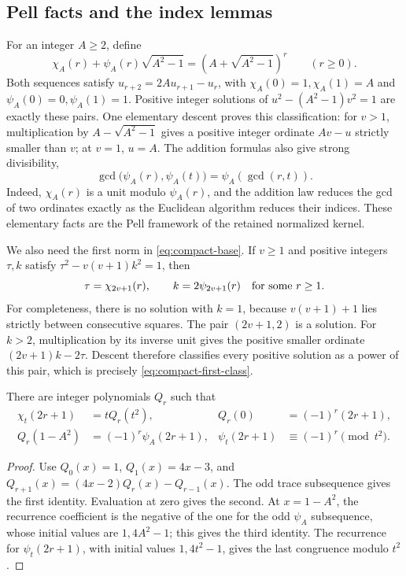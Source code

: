 \subsection{Pell facts and the index lemmas}
\label{subsec:compact-pell}

For an integer \(A\ge2\), define
\[
 \chi_A(r)+\psi_A(r)\sqrt{A^2-1}
       =(A+\sqrt{A^2-1})^r\qquad(r\ge0).
\]
Both sequences satisfy \(u_{r+2}=2Au_{r+1}-u_r\), with
\(\chi_A(0)=1,\chi_A(1)=A\) and
\(\psi_A(0)=0,\psi_A(1)=1\).
Positive integer solutions of \(u^2-(A^2-1)v^2=1\) are exactly these
pairs.  One elementary descent proves this classification: for \(v>1\),
multiplication by \(A-\sqrt{A^2-1}\) gives a positive integer ordinate
\(Av-u\) strictly smaller than \(v\); at \(v=1\), \(u=A\).
The addition formulas also give strong divisibility,
\begin{equation}
 \gcd\bigl(\psi_A(r),\psi_A(t)\bigr)
       =\psi_A(\gcd(r,t)).                         \label{eq:compact-gcd}
\end{equation}
Indeed, \(\chi_A(r)\) is a unit modulo \(\psi_A(r)\), and the addition
law reduces the gcd of two ordinates exactly as the Euclidean algorithm
reduces their indices.  These elementary facts are the Pell framework
of the retained normalized kernel.\cite{native61}

We also need the first norm in \eqref{eq:compact-base}.  If \(v\ge1\)
and positive integers \(\tau,k\) satisfy
\(\tau^2-v(v+1)k^2=1\), then
\begin{equation}
 \tau=\chi_{2v+1}(r),\qquad k=2\psi_{2v+1}(r)
 \quad\hbox{for some }r\ge1.                       \label{eq:compact-first-class}
\end{equation}
For completeness, there is no solution with \(k=1\), because
\(v(v+1)+1\) lies strictly between consecutive squares.  The pair
\((2v+1,2)\) is a solution.  For \(k>2\), multiplication by its inverse
unit gives the positive smaller ordinate \((2v+1)k-2\tau\).  Descent
therefore classifies every positive solution as a power of this pair,
which is precisely \eqref{eq:compact-first-class}.

\begin{lemma}
\label{lem:compact-odd}
There are integer polynomials \(Q_r\) such that
\begin{align*}
 \chi_t(2r+1)&=tQ_r(t^2),&
 Q_r(0)&=(-1)^r(2r+1),\\
 Q_r(1-A^2)&=(-1)^r\psi_A(2r+1),&
 \psi_t(2r+1)&\equiv(-1)^r\pmod{t^2}.
\end{align*}
\end{lemma}
\begin{proof}
Use \(Q_0(x)=1\), \(Q_1(x)=4x-3\), and
\(Q_{r+1}(x)=(4x-2)Q_r(x)-Q_{r-1}(x)\).
The odd trace subsequence gives the first identity.  Evaluation at zero
gives the second.  At \(x=1-A^2\), the recurrence coefficient is the
negative of the one for the odd \(\psi_A\) subsequence, whose initial
values are \(1,4A^2-1\); this gives the third identity.  The recurrence
for \(\psi_t(2r+1)\), with initial values \(1,4t^2-1\), gives the last
congruence modulo \(t^2\).
\end{proof}

